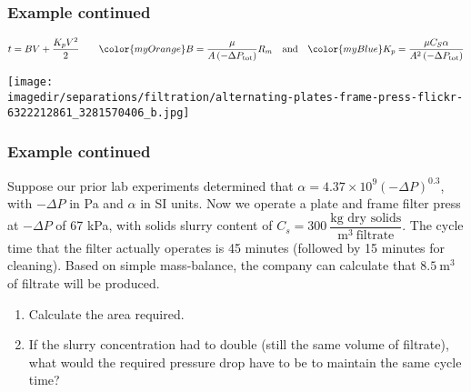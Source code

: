\begin{frame}\frametitle{Example continued}
	\[ t = BV +  \dfrac{K_pV^2}{2} 	\qquad {\color{myOrange}B = \dfrac{\mu}{A\left(-\Delta P_\text{tot}\right)} R_m } \quad \text{and} \quad {\color{myBlue}K_p = \dfrac{\mu C_S \alpha  }{A^2 \left(-\Delta P_\text{tot}\right)} } \]
	\begin{center}
		\texttt{[image: \\imagedir/separations/filtration/alternating-plates-frame-press-flickr-6322212861\_3281570406\_b.jpg]}
	\end{center}
	
\end{frame}

\begin{frame}\frametitle{Example continued}
	Suppose our prior lab experiments determined that $\alpha = 4.37\times 10^{9}\left(-\Delta P \right)^{0.3}$, with $-\Delta P$ in Pa and $\alpha$ in SI units.
	\vspace{12pt}
	Now we operate a plate and frame filter press at $-\Delta P$ of 67 kPa, with solids slurry content of $C_s = 300~\dfrac{\text{kg dry solids}}{\text{m}^3~\text{filtrate}}$. The cycle time that the filter actually operates is 45 minutes (followed by 15 minutes for cleaning). Based on simple mass-balance, the company can calculate that $8.5~\text{m}^3$ of filtrate will be produced.
	
	\vspace{12pt}
	\begin{enumerate}
		\item	Calculate the area required.
		\item	If the slurry concentration had to double (still the same volume of filtrate), what would the required pressure drop have to be to maintain the same cycle time?
	\end{enumerate}
	
\end{frame}


